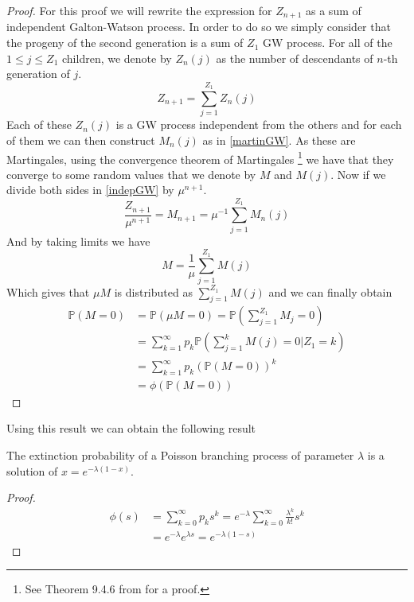 \begin{proof}
	For this proof we will rewrite the expression for $Z_{n+1}$ as a sum of independent Galton-Watson process. 
	In order to do so we simply consider that the progeny of the second generation is a sum of $Z_1$ GW process.
	For all of the $1 \leq j \leq Z_1$ children, we denote by $Z_n(j)$ as the number of descendants of $n$-th generation of $j$.
	\begin{equation}\label{indepGW}
		Z_{n+1} = \sum_{j=1}^{Z_1} Z_n(j)
	\end{equation}
	Each of these $Z_n(j)$ is a GW process independent from the others and for each of them we can then construct $M_n(j)$ as in \eqref{martinGW}.
	As these are Martingales, using the convergence theorem of Martingales
	\footnote{See Theorem 9.4.6 from \cite{chung00} for a proof.}
	we have that they converge to some random values that we denote by $M$ and $M(j)$.
	Now if we divide both sides in \eqref{indepGW} by $\mu^{n+1}$.
	\begin{equation}
		\frac{Z_{n+1}}{\mu^{n+1}} = M_{n+1} = \mu^{-1} \sum_{j=1}^{Z_1} M_n(j)
	\end{equation}
	And by taking limits we have
	\begin{equation}
		M = \frac{1}{\mu} \sum_{j=1}^{Z_1}M(j)
	\end{equation}
	Which gives that $\mu M$ is distributed as $\sum_{j=1}^{Z_1}M(j)$ and we can finally obtain
	\begin{align}
		\mathbb{P}(M = 0) 	&= \mathbb{P}(\mu M = 0) = \mathbb{P}(\sum_{j=1}^{Z_1}M_j = 0) \\
					&= \sum_{k=1}^{\infty} p_k \mathbb{P}(\sum_{j=1}^{k} M(j) = 0 | Z_1 = k) \\
					&= \sum_{k=1}^{\infty} p_k (\mathbb{P}(M=0))^k\\
					&= \phi(\mathbb{P}(M=0))
	\end{align}
\end{proof}
Using this result we can obtain the following result
\begin{theorem}
	The extinction probability of a Poisson branching process of parameter $\lambda$ is a solution of $x = e^{-\lambda(1-x)}$.
\end{theorem}
\begin{proof}
	\begin{align}
		\phi(s) &= \sum_{k=0}^{\infty} p_k s^k = e^{-\lambda} \sum_{k=0}^{\infty} \frac{\lambda ^k}{k!} s^k\\
			&= e^{-\lambda}e^{\lambda s} = e^{-\lambda(1 -s)}
	\end{align}
\end{proof}


